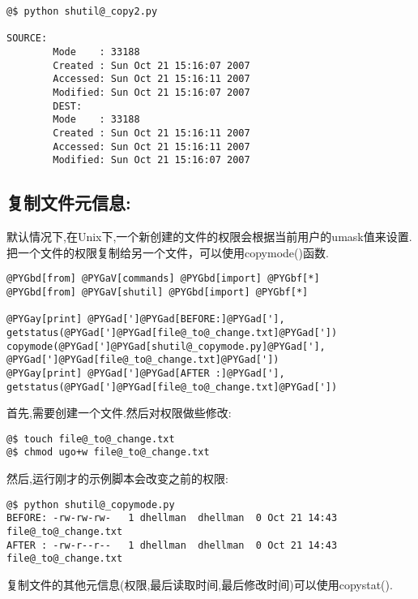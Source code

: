 \documentclass[letterpaper,10pt,english]{manual}
\begin{document}
\begin{Verbatim}[commandchars=@\[\]]
@$ python shutil@_copy2.py

SOURCE:
        Mode    : 33188
        Created : Sun Oct 21 15:16:07 2007
        Accessed: Sun Oct 21 15:16:11 2007
        Modified: Sun Oct 21 15:16:07 2007
        DEST:
        Mode    : 33188
        Created : Sun Oct 21 15:16:11 2007
        Accessed: Sun Oct 21 15:16:11 2007
        Modified: Sun Oct 21 15:16:07 2007
\end{Verbatim}


\subsection{复制文件元信息:}

默认情况下,在Unix下,一个新创建的文件的权限会根据当前用户的umask值来设置.把一个文件的权限复制给另一个文件，可以使用copymode()函数.

\begin{Verbatim}[commandchars=@\[\]]
@PYGbd[from] @PYGaV[commands] @PYGbd[import] @PYGbf[*]
@PYGbd[from] @PYGaV[shutil] @PYGbd[import] @PYGbf[*]

@PYGay[print] @PYGad[']@PYGad[BEFORE:]@PYGad['], getstatus(@PYGad[']@PYGad[file@_to@_change.txt]@PYGad['])
copymode(@PYGad[']@PYGad[shutil@_copymode.py]@PYGad['], @PYGad[']@PYGad[file@_to@_change.txt]@PYGad['])
@PYGay[print] @PYGad[']@PYGad[AFTER :]@PYGad['], getstatus(@PYGad[']@PYGad[file@_to@_change.txt]@PYGad['])
\end{Verbatim}

首先,需要创建一个文件.然后对权限做些修改:

\begin{Verbatim}[commandchars=@\[\]]
@$ touch file@_to@_change.txt
@$ chmod ugo+w file@_to@_change.txt
\end{Verbatim}

然后,运行刚才的示例脚本会改变之前的权限:

\begin{Verbatim}[commandchars=@\[\]]
@$ python shutil@_copymode.py
BEFORE: -rw-rw-rw-   1 dhellman  dhellman  0 Oct 21 14:43 file@_to@_change.txt
AFTER : -rw-r--r--   1 dhellman  dhellman  0 Oct 21 14:43 file@_to@_change.txt
\end{Verbatim}

复制文件的其他元信息(权限,最后读取时间,最后修改时间)可以使用copystat().
\end{document}
